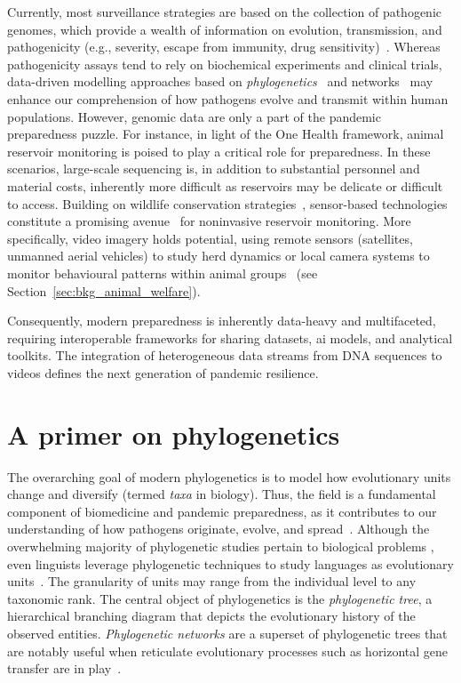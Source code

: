 Currently, most surveillance strategies are based on the collection of pathogenic genomes, which provide a wealth of information on evolution, transmission, and pathogenicity (e.g., severity, escape from immunity, drug sensitivity)~\cite{robishaw2021, djordjevic2024}. Whereas pathogenicity assays tend to rely on biochemical experiments and clinical trials, data-driven modelling approaches based on \textit{phylogenetics}~\cite{grenfell2004, biek2015} and networks~\cite{matteson2023} may enhance our comprehension of how pathogens evolve and transmit within human populations. However, genomic data are only a part of the pandemic preparedness puzzle. For instance, in light of the One Health framework, animal reservoir monitoring is poised to play a critical role for preparedness. In these scenarios, large-scale sequencing is, in addition to substantial personnel and material costs, inherently more difficult as reservoirs may be delicate or difficult to access. Building on wildlife conservation strategies~\cite{tuia2022}, sensor-based technologies constitute a promising avenue~\cite{watsa2020, barroso2023} for noninvasive reservoir monitoring. More specifically, video imagery holds potential, using remote sensors (satellites, unmanned aerial vehicles) to study herd dynamics or local camera systems to monitor behavioural patterns within animal groups~\cite{dawkins2003} (see Section~\ref{sec:bkg_animal_welfare}).

Consequently, modern preparedness is inherently data-heavy and multifaceted, requiring interoperable frameworks for sharing datasets, \gls{ai} models, and analytical toolkits. The integration of heterogeneous data streams from DNA sequences to videos defines the next generation of pandemic resilience.

\section{A primer on phylogenetics}
\label{sec:bkg_phylo}
The overarching goal of modern phylogenetics is to model how evolutionary units change and diversify (termed \emph{taxa} in biology). Thus, the field is a fundamental component of biomedicine and pandemic preparedness, as it contributes to our understanding of how pathogens originate, evolve, and spread~\cite{eickmann2003, dudas2017, attwood2022}. Although the overwhelming majority of phylogenetic studies pertain to biological problems \cite{felsenstein2004, yang2014, stadler2024}, even linguists leverage phylogenetic techniques to study languages as evolutionary units~\cite{greenhill2023, heggarty2023}. The granularity of units may range from the individual level to any taxonomic rank. The central object of phylogenetics is the \emph{phylogenetic tree}, a hierarchical branching diagram that depicts the evolutionary history of the observed entities. \textit{Phylogenetic networks} are a superset of phylogenetic trees that are notably useful when reticulate evolutionary processes such as horizontal gene transfer are in play~\cite{huson2006, stadler2024}.

